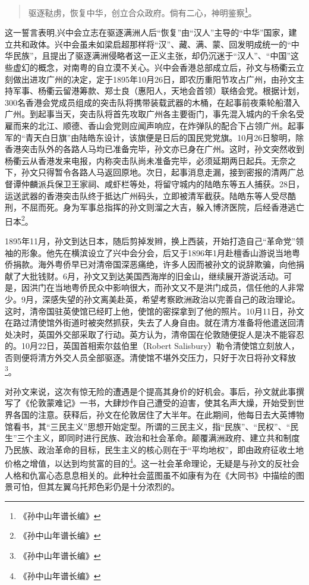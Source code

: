 \begin{quote}

驱逐鞑虏，恢复中华，创立合众政府。倘有二心，神明鉴察\footnote{《孙中山年谱长编》}。

\end{quote}

这一誓言表明,兴中会立志在驱逐满洲人后“恢复”由“汉人”主导的“中华”国家，建立共和政体。兴中会虽未如梁启超那样将“汉”、藏、满、蒙、回发明成统一的“中华民族”，且提出了驱逐满洲侵略者这一正义主张，却仍沉迷于“汉人”、“中国”这些虚幻的概念，对南粤的自立漠不关心。兴中会香港总部成立后，孙文与杨衢云立刻做出进攻广州的决定，定于1895年10月26日，即农历重阳节攻占广州，由孙文主持军事、杨衢云留港筹款、郑士良（惠阳人，天地会首领）联络会党。根据计划，300名香港会党成员组成的突击队将携带装载武器的木桶，在起事前夜乘轮船潜入广州。到起事当天，突击队将首先攻取广州各主要衙门，事先混入城内的千余名受雇而来的北江、顺德、香山会党则应闻声响应，在炸弹队的配合下占领广州。起事军的“青天白日旗”由陆皓东设计，该旗便是日后的国民党党旗。10月26日黎明，除香港突击队外的各路人马均已准备完毕，孙文亦已身在广州。这时，孙文突然收到杨衢云从香港发来电报，内称突击队尚未准备完毕，必须延期两日起兵。无奈之下，孙文只得暂令各路人马返回原地。次日，起事消息走漏，接到密报的清两广总督谭仲麟派兵保卫王家祠、咸虾栏等处，将留守城内的陆皓东等五人捕获。28日，运送武器的香港突击队终于抵达广州码头，立即被清军截获。陆皓东等人受尽酷刑，不屈而死。身为军事总指挥的孙文则溜之大吉，躲入博济医院，后经香港逃亡日本\footnote{《孙中山年谱长编》}。

1895年11月，孙文到达日本，随后剪掉发辫，换上西装，开始打造自己“革命党”领袖的形象。他先在横滨设立了兴中会分会，后又于1896年1月赴檀香山游说当地粤侨捐款。海外粤侨早已对清帝国深恶痛绝，许多人因而被孙文的说辞欺骗，向他捐献了大批钱财。6月，孙文又到达美国西海岸的旧金山，继续展开游说活动。可是，因洪门在当地粤侨民众中影响很大，而孙文又不是洪门成员，信任他的人非常少。9月，深感失望的孙文离美赴英，希望考察欧洲政治以完善自己的政治理论。这时，清帝国驻英使馆已经盯上他，使馆的密探拿到了他的照片。10月11日，孙文在路过清使馆外街道时被突然抓获，失去了人身自由。就在清方准备将他遣送回清处决时，英国外交部采取了行动。英方认为，清帝国在伦敦随便捉人是决不能容忍的。10月22日，英国首相索尔兹伯里（Robert Salisbury）勒令清使馆立刻放人，否则便将清方外交人员全部驱逐。清使馆不堪外交压力，只好于次日将孙文释放\footnote{《孙中山年谱长编》}。

对孙文来说，这次有惊无险的遭遇是个提高其身价的好机会。事后，孙文就此事撰写了《伦敦蒙难记》一书，大肆炒作自己遭受的迫害，使其名声大燥，开始受到世界各国的注意。获释后，孙文在伦敦居住了大半年。在此期间，他每日去大英博物馆看书，其“三民主义”思想开始定型。所谓的三民主义，指“民族”、“民权”、“民生”三个主义，即同时进行民族、政治和社会革命。颠覆满洲政府、建立共和制度乃民族、政治革命的目标，民生主义的核心则在于“平均地权”，即由政府征收土地价格之增值，以达到均贫富的目的\footnote{《孙中山年谱长编》}。这一社会革命理论，无疑是与孙文的反社会人格和仇富心态息息相关的。此种社会蓝图虽不如康有为在《大同书》中描绘的图景可怕，但其左翼乌托邦色彩仍是十分浓烈的。

